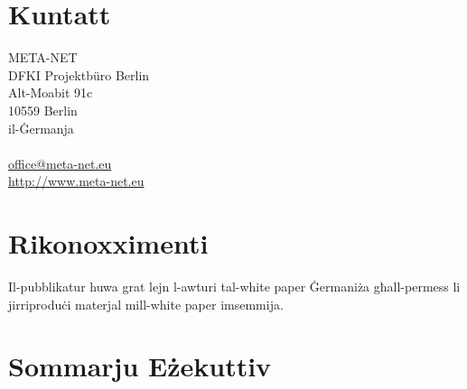 \documentclass[11pt]{article}
\begin{document}
  \section*{Kuntatt}
  META-NET\\
  DFKI Projektbüro Berlin\\
  Alt-Moabit 91c\\
  10559 Berlin\\
  il-Ġermanja\\\\
  \url{office@meta-net.eu}\\
  \url{http://www.meta-net.eu}
  
  \section*{Rikonoxximenti}
  Il-pubblikatur huwa grat lejn l-awturi tal-white paper Ġermaniża għall-permess li jirriproduċi materjal mill-white paper imsemmija. 
  
  \section*{Sommarju Eżekuttiv}
    
\end{document}
